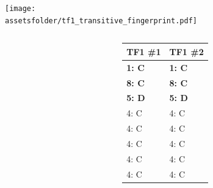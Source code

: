 \documentclass{beamer}
\newcommand{\assetsfolder}{./assets}
\newcommand{\researchfolder}{$HOME/rsc/axelrod-moran}
\begin{document}
\begin{frame}
    \begin{center}
        \texttt{[image: \\assetsfolder/tf1\_transitive\_fingerprint.pdf]}
    \end{center}
\end{frame}

\begin{frame}
    \begin{columns}
        \begin{column}{.6\textwidth}
            \begin{center}
                \scalebox{.49}{
                    
                }
            \end{center}
        \end{column}

        \begin{column}{.4\textwidth}
            \small
            \begin{tabular}{ll}
                \toprule
                TF1 \#1   & TF1 \#2\\
                \midrule
                \bf{1}: C & \bf{1}: C  \\
                \bf{8}: C & \bf{8}: C  \\
                \bf{5}: D & \bf{5}: D  \\
                4: C      & 4: C  \\
                4: C      & 4: C  \\
                4: C      & 4: C  \\
                4: C      & 4: C  \\
                4: C      & 4: C  \\
                \bottomrule
            \end{tabular}
        \end{column}
    \end{columns}
\end{frame}


\begin{frame}
    \Huge
    \begin{center}
    \end{center}
\end{frame}
\end{document}
